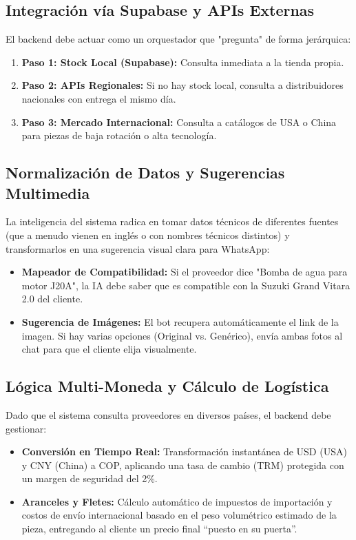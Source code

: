 \documentclass[12pt,a4paper]{article}
\begin{document}
\subsection{Integración vía Supabase y APIs Externas}
El backend debe actuar como un orquestador que "pregunta" de forma jerárquica:
\begin{enumerate}
    \item \textbf{Paso 1: Stock Local (Supabase):} Consulta inmediata a la tienda propia.
    \item \textbf{Paso 2: APIs Regionales:} Si no hay stock local, consulta a distribuidores nacionales con entrega el mismo día.
    \item \textbf{Paso 3: Mercado Internacional:} Consulta a catálogos de USA o China para piezas de baja rotación o alta tecnología.
\end{enumerate}

\subsection{Normalización de Datos y Sugerencias Multimedia}
La inteligencia del sistema radica en tomar datos t\'ecnicos de diferentes fuentes (que a menudo vienen en inglés o con nombres t\'ecnicos distintos) y transformarlos en una sugerencia visual clara para WhatsApp:
\begin{itemize}
    \item \textbf{Mapeador de Compatibilidad:} Si el proveedor dice "Bomba de agua para motor J20A", la IA debe saber que es compatible con la Suzuki Grand Vitara 2.0 del cliente.
    \item \textbf{Sugerencia de Imágenes:} El bot recupera automáticamente el link de la imagen. Si hay varias opciones (Original vs. Genérico), envía ambas fotos al chat para que el cliente elija visualmente.
\end{itemize}

\subsection{L\'ogica Multi-Moneda y Cálculo de Logística}
Dado que el sistema consulta proveedores en diversos países, el backend debe gestionar:
\begin{itemize}
    \item \textbf{Conversión en Tiempo Real:} Transformación instantánea de USD (USA) y CNY (China) a COP, aplicando una tasa de cambio (TRM) protegida con un margen de seguridad del 2\%.
    \item \textbf{Aranceles y Fletes:} Cálculo automático de impuestos de importación y costos de envío internacional basado en el peso volumétrico estimado de la pieza, entregando al cliente un precio final ``puesto en su puerta''.
\end{itemize}
\end{document}
